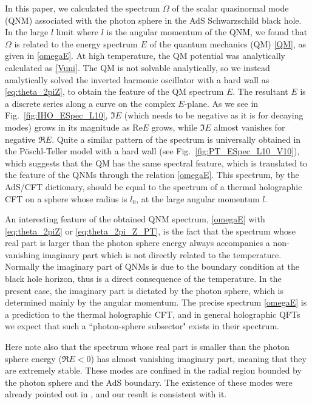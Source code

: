 \documentclass[a4paper,11pt]{article}
\begin{document}
In this paper, we calculated the spectrum $\Omega$ of the scalar quasinormal mode (QNM) associated with the photon sphere in the AdS Schwarzschild black hole.
In the large $l$ limit where $l$ is the angular momentum of the QNM, we found that $\Omega$ is related to the energy spectrum $E$ of the quantum mechanics (QM) \eqref{QM}, as given in \eqref{omegaE}. At high temperature, the QM potential was analytically calculated as \eqref{Vuni}. The QM is not solvable analytically, so we instead analytically solved the inverted harmonic oscillator with a hard wall as \eqref{eq:theta_2piZ}, to obtain the feature of the QM spectrum $E$.
The resultant $E$ is a discrete series along a curve on the complex $E$-plane. As we see in Fig.~\ref{fig:IHO_ESpec_L10}, $\Im E$ (which needs to be negative as it is for decaying modes) grows in its magnitude as Re$E$ grows, while $\Im E$ almost vanishes for negative $\Re E$.  
Quite a similar pattern of the spectrum is universally obtained in the P\"oschl-Teller model with a hard wall (see Fig.~\ref{fig:PT_ESpec_L10_V10}), which suggests that the QM has the same spectral feature, which is translated to the feature of the QNMs through the relation \eqref{omegaE}.
This spectrum, by the AdS/CFT dictionary, should be equal to the spectrum of a thermal holographic CFT on a sphere whose radius is $l_0$, at the large angular momentum $l$.

An interesting feature of the obtained QNM spectrum, \eqref{omegaE} with \eqref{eq:theta_2piZ} or \eqref{eq:theta_2pi_Z_PT}, is the fact that the spectrum whose real part is larger than the photon sphere energy always accompanies a non-vanishing imaginary part which is not directly related to the temperature.
Normally the imaginary part of QNMs is due to the boundary condition at the black hole horizon, thus is a direct consequence of the temperature. In the present case, the imaginary part is dictated by the photon sphere, which is determined mainly by the angular momentum.
The precise spectrum \eqref{omegaE} is a prediction to the thermal holographic CFT, and in general holographic QFTs we expect that such a ``photon-sphere subsector" exists in their spectrum.

Here note also that the spectrum whose real part is smaller than the photon sphere energy ($\Re E<0$) has almost vanishing imaginary part,
meaning that they are extremely stable. These modes are confined in the radial region bounded by the photon sphere and the AdS boundary. The existence of these modes were already pointed out in \cite{Festuccia:2008zx}, and our result is consistent with it.
\end{document}
